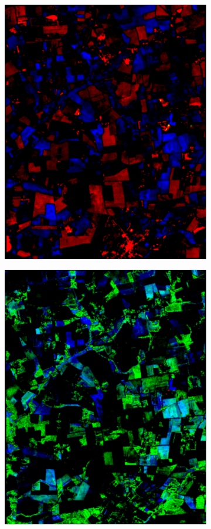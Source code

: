 \documentclass[journal,article,submit,pdftex,moreauthors]{Definitions/mdpi}
\begin{document}
\begin{figure}[H]
\begin{subfigure}[t]{0.23\linewidth}
	\caption{}
	\label{fig:color_map_a}
	\end{subfigure}
	\begin{subfigure}[t]{0.23\linewidth}
		\centering
	  \includegraphics[height=\linewidth,width=0.95\linewidth]{figures/combinations/combinations_[30, 11, 141].pdf}
	\caption{}
	\label{fig:color_map_b}
	\end{subfigure}
	\begin{subfigure}[t]{0.23\linewidth}
		\centering
		\includegraphics[height=\linewidth,width=0.95\linewidth]{figures/combinations/combinations_[45, 66, 57].pdf}

\end{subfigure}
\end{figure}
\end{document}
